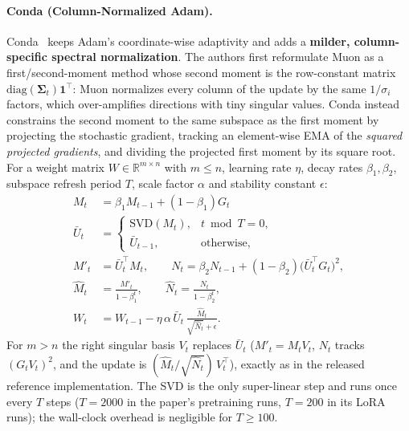 \paragraph{Conda (Column-Normalized Adam).}
Conda~\citep{wang_conda_2025} keeps Adam's coordinate-wise adaptivity and adds a
\textbf{milder, column-specific spectral normalization}. The authors first reformulate
Muon as a first/second-moment method whose second moment is the row-constant matrix
$\mathrm{diag}(\mathbf{\Sigma}_t)\mathbf{1}^\top$: Muon normalizes every column of the
update by the same $1/\sigma_i$ factors, which over-amplifies directions with tiny
singular values. Conda instead constrains the second moment to the same subspace as the
first moment by projecting the stochastic gradient, tracking an element-wise EMA of the
\emph{squared projected gradients}, and dividing the projected first moment by its square
root. For a weight matrix $W \in \mathbb{R}^{m \times n}$ with $m \le n$, learning rate
$\eta$, decay rates $\beta_1,\beta_2$, subspace refresh period $T$, scale factor $\alpha$
and stability constant $\epsilon$:
\begin{align}
M_t &= \beta_1 M_{t-1} + (1-\beta_1) G_t \\
\bar U_t &=
\begin{cases}
\mathrm{SVD}(M_t), & t \bmod T = 0, \\
\bar U_{t-1}, & \text{otherwise},
\end{cases} \\
M'_t &= \bar U_t^\top M_t, \qquad
N_t = \beta_2 N_{t-1} + (1-\beta_2)\big(\bar U_t^\top G_t\big)^2, \\
\widehat M_t &= \frac{M'_t}{1-\beta_1^t}, \qquad
\widehat N_t = \frac{N_t}{1-\beta_2^t}, \\
W_t &= W_{t-1} - \eta\,\alpha\,\bar U_t\,
      \frac{\widehat M_t}{\sqrt{\widehat N_t} + \epsilon}.
\end{align}
For $m > n$ the right singular basis $V_t$ replaces $\bar U_t$ ($M'_t = M_t V_t$, $N_t$
tracks $(G_t V_t)^2$, and the update is $(\widehat M_t/\sqrt{\widehat N_t})\,V_t^\top$),
exactly as in the released reference implementation. The SVD is the only super-linear
step and runs once every $T$ steps ($T=2000$ in the paper's pretraining runs, $T=200$ in
its LoRA runs); the wall-clock overhead is negligible for $T \ge 100$.

